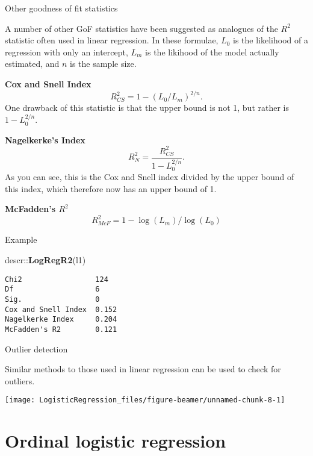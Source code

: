 \documentclass[10pt,ignorenonframetext,]{beamer}
\newenvironment{Shaded}{\begin{snugshade}}{\end{snugshade}}
\newcommand{\KeywordTok}[1]{\textcolor[rgb]{0.13,0.29,0.53}{\textbf{{#1}}}}
\newcommand{\NormalTok}[1]{{#1}}
\begin{document}
\begin{frame}{Other goodness of fit statistics}

A number of other GoF statistics have been suggested as analogues of the
\(R^2\) statistic often used in linear regression. In these formulae,
\(L_0\) is the likelihood of a regression with only an intercept,
\(L_m\) is the likihood of the model actually estimated, and \(n\) is
the sample size.

\textbf{Cox and Snell Index} \[
R^2_{CS} = 1 - (L_0 / L_m)^{2/n}.
\] One drawback of this statistic is that the upper bound is not 1, but
rather is \(1 - L_0^{2/n}.\)

\textbf{Nagelkerke's Index} \[
R^2_N = \frac{R^2_{CS}}{1 - L_0^{2/n}}.
\] As you can see, this is the Cox and Snell index divided by the upper
bound of this index, which therefore now has an upper bound of 1.

\textbf{McFadden's \(R^2\)} \[
R^2_{McF} =   1 - \log(L_m) / \log(L_0)
\]

\end{frame}

\begin{frame}[fragile]{Example}

\begin{Shaded}
\begin{Highlighting}[]
\NormalTok{descr::}\KeywordTok{LogRegR2}\NormalTok{(l1)}
\end{Highlighting}
\end{Shaded}

\begin{verbatim}
Chi2                 124
Df                   6
Sig.                 0
Cox and Snell Index  0.152
Nagelkerke Index     0.204
McFadden's R2        0.121
\end{verbatim}

\end{frame}

\begin{frame}{Outlier detection}

Similar methods to those used in linear regression can be used to check
for outliers.

\begin{center}\texttt{[image: LogisticRegression\_files/figure-beamer/unnamed-chunk-8-1]} \end{center}

\end{frame}

\section{Ordinal logistic regression}\label{ordinal-logistic-regression}
\end{document}

